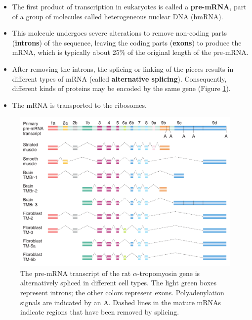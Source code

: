 \documentclass[11pt,ignorenonframetext,aspectratio=169]{beamer}
\providecommand{\tightlist}{%
  \setlength{\itemsep}{0pt}\setlength{\parskip}{0pt}}
\begin{document}
\begin{frame}{}
\protect\hypertarget{section-19}{}

\begin{itemize}
\tightlist
\item
  The first product of transcription in eukaryotes is called a
  \textbf{pre-mRNA}, part of a group of molecules called heterogeneous
  nuclear DNA (hmRNA).
\item
  This molecule undergoes severe alterations to remove non-coding parts
  (\textbf{introns}) of the sequence, leaving the coding parts
  (\textbf{exons}) to produce the mRNA, which is typically about 25\% of
  the original length of the pre-mRNA.
\item
  After removing the introns, the splicing or linking of the pieces
  results in different types of mRNA (called \textbf{alternative
  splicing}). Consequently, different kinds of proteins may be encoded
  by the same gene (Figure \ref{fig:mrna-alternative-splicing}).
\item
  The mRNA is transported to the ribosomes.
\end{itemize}

\end{frame}

\begin{frame}{}
\protect\hypertarget{section-20}{}

\begin{figure}
\includegraphics[width=0.65\linewidth]{../images/alternative_splicing} \caption{The pre-mRNA transcript of the rat $\alpha$-tropomyosin gene is alternatively spliced in different cell types. The light green boxes represent introns; the other colors represent exons. Polyadenylation signals are indicated by an A. Dashed lines in the mature mRNAs indicate regions that have been removed by splicing.}\label{fig:mrna-alternative-splicing}
\end{figure}

\end{frame}
\end{document}
